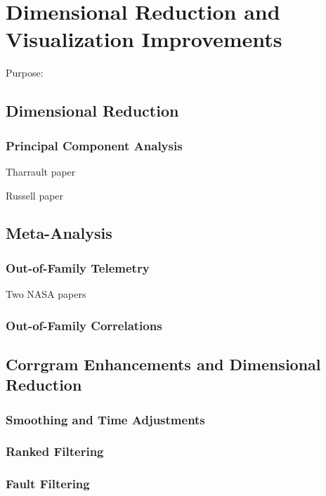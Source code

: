
\chapter{Dimensional Reduction and Visualization Improvements}

Purpose:



\section{Dimensional Reduction}

\subsection{Principal Component Analysis}

Tharrault paper

Russell paper

\section{Meta-Analysis}

\subsection{Out-of-Family Telemetry}

Two NASA papers

\subsection{Out-of-Family Correlations}



\section{Corrgram Enhancements and Dimensional Reduction}

\subsection{Smoothing and Time Adjustments}

\subsection{Ranked Filtering}

\subsection{Fault Filtering}

